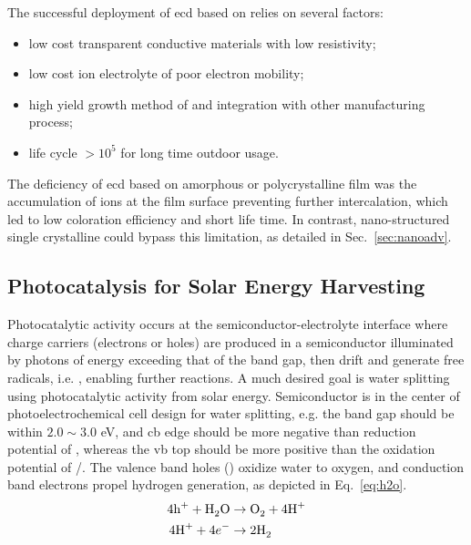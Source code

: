 The successful deployment of \gls{ecd} based on  relies on several factors:\cite{Granqvist2000}
\begin{itemize}
\item low cost transparent conductive materials with low resistivity;
\item low cost ion electrolyte of poor electron mobility;
\item high yield growth method of  and integration with other manufacturing process; 
\item life cycle $> 10^5$ for long time outdoor usage.
\end{itemize}
The deficiency of \gls{ecd} based on amorphous or polycrystalline  film was the accumulation of ions at the film surface preventing further intercalation,\cite{Dini1996} which led to low coloration efficiency and short life time. In contrast, nano-structured single crystalline  could bypass this limitation, as detailed in Sec.~\ref{sec:nanoadv}.

\subsection{Photocatalysis for Solar Energy Harvesting}

Photocatalytic activity occurs at the semiconductor-electrolyte interface where charge carriers (electrons or holes) are produced in a semiconductor illuminated by photons of energy exceeding that of the band gap, then drift and generate free radicals, i.e. , enabling further reactions. A much desired goal is water splitting using photocatalytic activity from solar energy. Semiconductor is in the center of photoelectrochemical cell design for water splitting, e.g. the band gap should be within $2.0 \sim 3.0 $ eV, and \gls{cb} edge should be more negative than reduction potential of , whereas the \gls{vb} top should be more positive than the oxidation potential of /.\cite{Osterloh2008,Wang2012} The valence band holes () oxidize water to oxygen, and conduction band electrons propel hydrogen generation, as depicted in Eq.~\ref{eq:h2o}.
\begin{subequations}\label{eq:h2o}
\begin{align}
4\ce{h^+} +  \ce{H2O} &\rightarrow \ce{O2} + 4\ce{H^+} \label{eq:hervb}\\
4\ce{H^+} +  4e^- &\rightarrow 2\ce{H2} \label{eq:hercb}
\end{align}
\end{subequations}

